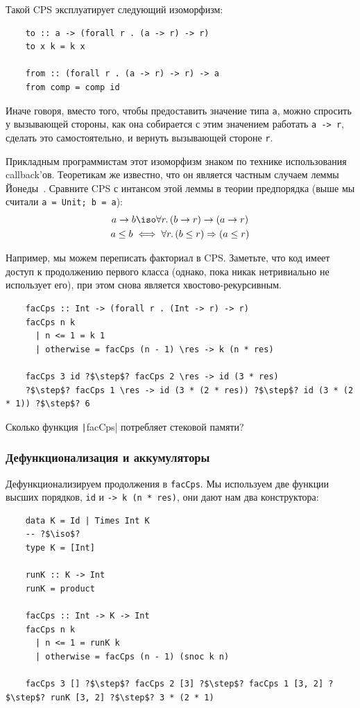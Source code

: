 Такой CPS эксплуатирует следующий изоморфизм:
\begin{verbatim}
    to :: a -> (forall r . (a -> r) -> r)
    to x k = k x

    from :: (forall r . (a -> r) -> r) -> a
    from comp = comp id
\end{verbatim}
Иначе говоря, вместо того, чтобы предоставить значение типа \texttt{a}, можно спросить у вызывающей стороны, как она собирается с этим значением работать \texttt{a -> r}, сделать это самостоятельно, и вернуть вызывающей стороне \texttt{r}.

Прикладным программистам этот изоморфизм знаком по технике использования callback'ов.
Теоретикам же известно, что он является частным случаем леммы Йонеды~\cite{hinze2010reason}.
Сравните CPS с интансом этой леммы в теории предпорядка (выше мы считали \texttt{a = Unit; b = a}):
\begin{gather*}
    a\to b \iso \forall r\ldotp (b\to r)\to (a\to r) \\
    a \le b \iff \forall r\ldotp (b \le r) \Rightarrow (a \le r)
\end{gather*}

Например, мы можем переписать факториал в CPS.
Заметьте, что код имеет доступ к продолжению первого класса (однако, пока никак нетривиально не использует его), при этом снова является хвостово-рекурсивным.
\begin{verbatim}
    facCps :: Int -> (forall r . (Int -> r) -> r)
    facCps n k
      | n <= 1 = k 1
      | otherwise = facCps (n - 1) \res -> k (n * res)

    facCps 3 id ?$\step$? facCps 2 \res -> id (3 * res)
    ?$\step$? facCps 1 \res -> id (3 * (2 * res)) ?$\step$? id (3 * (2 * 1)) ?$\step$? 6
\end{verbatim}

\begin{task}
    Сколько функция \texttt|facCps| потребляет стековой памяти?
\end{task}

\subsubsection{Дефункционализация и аккумуляторы} \label{subsubsec:defunctionalization-cont}

Дефункционализируем продолжения в \texttt{facCps}.
Мы используем две функции высших порядков, \texttt{id} и \texttt{\res -> k (n * res)}, они дают нам два конструктора:
\begin{verbatim}
    data K = Id | Times Int K
    -- ?$\iso$?
    type K = [Int]

    runK :: K -> Int
    runK = product

    facCps :: Int -> K -> Int
    facCps n k
      | n <= 1 = runK k
      | otherwise = facCps (n - 1) (snoc k n)

    facCps 3 [] ?$\step$? facCps 2 [3] ?$\step$? facCps 1 [3, 2] ?$\step$? runK [3, 2] ?$\step$? 3 * (2 * 1)
\end{verbatim}

